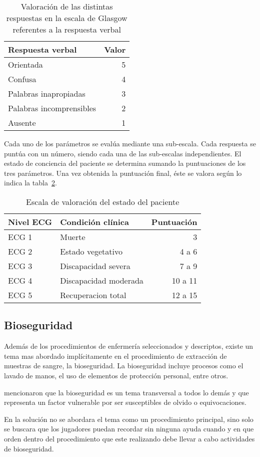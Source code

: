 \begin{table}[!hbt]
\centering
\begin{tabular}{lr}
\toprule
\textbf{Respuesta verbal} & \textbf{Valor} \\
\midrule
Orientada & 5 \\
Confusa & 4 \\
Palabras inapropiadas & 3 \\
Palabras incomprensibles & 2 \\
Ausente & 1 \\
\bottomrule
\end{tabular}
\caption{Valoración de las distintas respuestas en la escala de Glasgow
    referentes a la respuesta verbal}
\label{tab:seleccion_glasgow_respuestas_verbal}
\end{table}

Cada uno de los parámetros se evalúa mediante una sub-escala. Cada respuesta se
puntúa con un número, siendo cada una de las sub-escalas independientes. El
estado de conciencia del paciente se determina sumando la puntuaciones de los
tres parámetros. Una vez obtenida la puntuación final, éste se valora según lo
indica la tabla~\ref{tab:seleccion_glasgow_estado}.

\begin{table}[!hbt]
\centering
\begin{tabular}{llr}
\toprule
\textbf{Nivel ECG} & 
\textbf{Condición clínica} & 
\textbf{Puntuación} \\ 
\midrule
 ECG 1 & Muerte & 3 \\
 ECG 2 & Estado vegetativo & 4 a 6 \\
 ECG 3 & Discapacidad severa & 7 a 9 \\
 ECG 4 & Discapacidad moderada & 10 a 11 \\
 ECG 5 & Recuperacion total & 12 a 15 \\
\bottomrule
\end{tabular}
\caption{Escala de valoración del estado del paciente}
\label{tab:seleccion_glasgow_estado}
\end{table}

\subsection{Bioseguridad}

Además de los procedimientos de enfermería seleccionados y descriptos, existe un
tema mas abordado implícitamente en el procedimiento de extracción de muestras
de sangre, la bioseguridad. La bioseguridad incluye procesos como el lavado de
manos, el uso de elementos de protección personal, entre otros.

 mencionaron que la bioseguridad es un tema
transversal a todos lo demás y que representa un factor vulnerable por ser
susceptibles de olvido o equivocaciones.

En la solución no se abordara el tema como un procedimiento principal, sino solo
se buscara que los jugadores puedan recordar sin ninguna ayuda cuando y en que
orden dentro del procedimiento que este realizando debe llevar a cabo
actividades de bioseguridad.
